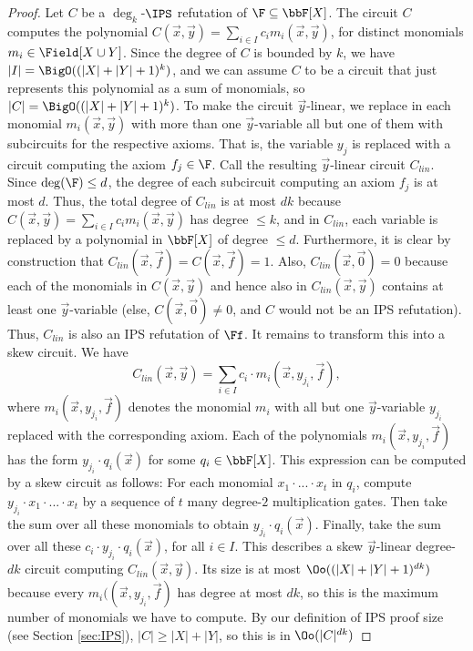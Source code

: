 \documentclass[a4paper,UKenglish,cleveref, autoref, thm-restate]{lipics-v2021}
\begin{document}
\begin{proof}
	Let $C$ be a $\deg_k$-$\IPS$ refutation of $\F \subseteq \bbF[X]$.
	The circuit $C$ computes the polynomial
	$C(\vec x,\vec y) = \sum_{i\in I} c_im_i(\vec x,\vec y)$,
	for distinct monomials $m_i \in \Field[X \cup Y]$. Since the degree of
	$C$ is bounded by $k$, we have $|I|= \BigO((|X| + |Y|+1)^{k})$, and we can assume $C$ to be a circuit that just represents this polynomial as a sum of monomials, so $|C| = \BigO((|X| + |Y|+1)^{k})$.
	To make the circuit $\vec y$-linear, we replace in each monomial $m_i(\vec x, \vec y)$ with more than one $\vec y$-variable all but one of them with subcircuits for the respective axioms. That is, the variable $y_j$ is replaced with a circuit computing the axiom $f_j \in \F$. Call the resulting $\vec y$-linear
	circuit $C_{lin}$. Since $\deg(\F) \leq d$, the degree of each subcircuit computing an axiom $f_j$ is at most $d$. Thus, the total degree of $C_{lin}$ is at most $dk$ because $C(\vec x,\vec y) = \sum_{i\in I} c_im_i(\vec x,\vec y)$ has degree $\leq k$, and in $C_{lin}$, each variable is replaced by a polynomial in $\bbF[X]$ of degree $\leq d$. Furthermore, it is clear by construction that $C_{lin}(\vec x, \vec f) = C(\vec x, \vec f) = 1$. Also, $C_{lin}(\vec x, \vec 0) = 0$ because each of the monomials in $C(\vec x, \vec y)$ and hence also in $C_{lin}(\vec x, \vec y)$ contains at least one $\vec y$-variable (else, $C(\vec x, \vec 0) \neq 0$, and $C$ would not be an IPS refutation). Thus, $C_{lin}$ is also an IPS refutation of $\Ff$. It remains to transform this into a skew circuit. We have
	\[
	C_{lin}(\vec x,\vec y) = \sum_{i\in I} c_i \cdot m_i(\vec x,y_{j_i},\vec f),
	\]
	where $m_i(\vec x,y_{j_i},\vec f)$ denotes the monomial $m_i$ with all but one $\vec y$-variable $y_{j_i}$ replaced with the corresponding axiom. Each of the polynomials $m_i(\vec x,y_{j_i},\vec f)$ has the form $y_{j_i} \cdot q_i(\vec x)$ for some $q_i \in \bbF[X]$. This expression can be computed by a skew circuit as follows: For each monomial $x_{1} \cdot ...  \cdot x_t$ in $q_i$, compute $y_{j_i} \cdot x_{1} \cdot ...  \cdot x_t$ by a sequence of $t$ many degree-$2$ multiplication gates. Then take the sum over all these monomials to obtain $y_{j_i} \cdot q_i(\vec x)$. Finally, take the sum over all these $c_i \cdot y_{j_i} \cdot q_i(\vec x)$, for all $i \in I$. This describes a skew $\vec y$-linear degree-$dk$ circuit computing $C_{lin}(\vec x,\vec y)$. Its size is at most $\Oo((|X| + |Y|+1)^{dk})$ because every $m_i((\vec x,y_{j_i},\vec f)$ has degree at most $dk$, so this is the maximum number of monomials we have to compute.
	By our definition of IPS proof size (see Section \ref{sec:IPS}), $|C| \geq |X| + |Y|$, so this is in $\Oo(|C|^{dk})$
\end{proof}	
\end{document}
